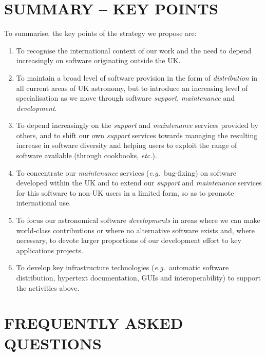 \documentclass[twoside,11pt]{article}
\newcommand{\htmlref}[2]{#1}
\newcommand{\st}[1]{{\em{#1}}}
\newcommand{\dev}[1]{\htmlref{#1}{development}}
\newcommand{\dis}[1]{\htmlref{#1}{distribution}}
\newcommand{\mnt}[1]{\htmlref{#1}{maintenance}}
\newcommand{\spt}[1]{\htmlref{#1}{support}}
\begin{document}
\section{SUMMARY -- KEY POINTS}

To summarise, the key points of the strategy we propose are:

\begin{enumerate}

\item To recognise the international context of our work and
the need to depend increasingly on software originating outside the
UK.

\item To maintain a broad level of software provision in the form of
\st{\dis{distribution}} in all current areas of UK astronomy, but to
introduce an increasing level of specialisation as we move through
software \st{\spt{support}}, \st{\mnt{maintenance}} and \st{\dev{development}}.

\item To depend increasingly on the \st{support} and \st{maintenance}
services provided by others, and to shift our own \st{support}
services towards managing the resulting increase in software diversity
and helping users to exploit the range of software available
(through cookbooks, \st{etc.}).

\item To concentrate our \st{maintenance} services (\st{e.g.}\ bug-fixing) on
software developed within the UK and to extend our \st{support} and
\st{maintenance} services for this software to non-UK users in a
limited form, so as to promote international use.

\item To focus our astronomical software \st{developments} in areas where
we can make world-class contributions or where no alternative software
exists and, where necessary, to devote larger proportions of our
development effort to key applications projects.

\item To develop key infrastructure technologies (\st{e.g.}\ automatic
software distribution, hypertext documentation, GUIs and
interoperability) to support the activities above.
\end{enumerate}

\newpage
\appendix
\section{FREQUENTLY ASKED QUESTIONS}
\end{document}
